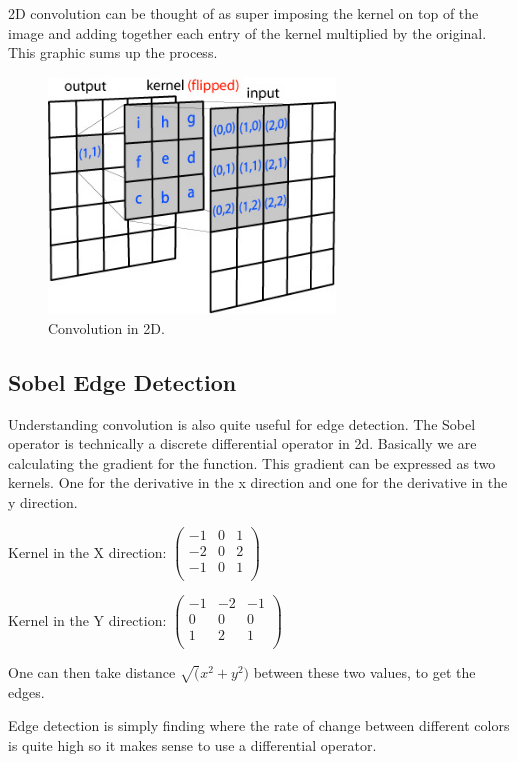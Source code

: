 \documentclass[11pt]{article}
\begin{document}
2D convolution can be thought of as super imposing the kernel on top of the image and adding together each entry of the kernel multiplied by the original.
This graphic sums up the process.
\begin{figure}[htp]
\centering
\includegraphics[width=3in]{conv2d_matrix.jpg}
\caption{Convolution in 2D.}
\label{}
\end{figure}

\subsection{Sobel Edge Detection}
Understanding convolution is also quite useful for edge detection. The Sobel operator is technically a discrete differential operator in 2d. Basically we are calculating the gradient for the function. This gradient can be expressed as two kernels. One for the derivative in the x direction and one for the derivative in the y direction. 

Kernel in the X direction:
$\begin{pmatrix}
	-1 & 0 & 1\\
	-2 & 0 & 2\\
	-1 & 0 & 1\\
\end{pmatrix}$

Kernel in the Y direction:
$\begin{pmatrix}
	-1 & -2 & -1\\
	0 & 0 & 0\\
	1 & 2 & 1\\
\end{pmatrix}$
 
One can then take distance $\sqrt(x^2+y^2)$ between these two values, to get the edges. 

Edge detection is simply finding where the rate of change between different colors is quite high so it makes sense to use a differential operator. 
\end{document}
